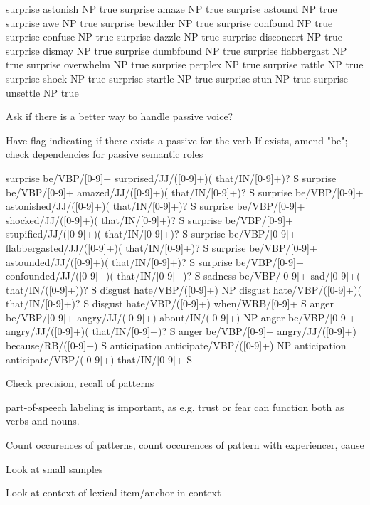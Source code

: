 surprise	astonish	NP	true
surprise	amaze	NP	true
surprise	astound	NP	true
surprise	awe	NP	true
surprise	bewilder	NP	true
surprise	confound	NP	true
surprise	confuse	NP	true
surprise	dazzle	NP	true
surprise	disconcert	NP	true
surprise	dismay	NP	true
surprise	dumbfound	NP	true
surprise	flabbergast	NP	true
surprise	overwhelm	NP	true
surprise	perplex	NP	true
surprise	rattle	NP	true
surprise	shock	NP	true
surprise	startle	NP	true
surprise	stun	NP	true
surprise	unsettle	NP	true


Ask if there is a better way to handle passive voice?

Have flag indicating if there exists a passive for the verb
If exists, amend "be"; check dependencies for passive semantic roles




surprise	be/VBP/[0-9]+ surprised/JJ/([0-9]+)( that/IN/[0-9]+)?	S
surprise	be/VBP/[0-9]+ amazed/JJ/([0-9]+)( that/IN/[0-9]+)?	S
surprise	be/VBP/[0-9]+ astonished/JJ/([0-9]+)( that/IN/[0-9]+)?	S
surprise	be/VBP/[0-9]+ shocked/JJ/([0-9]+)( that/IN/[0-9]+)?	S
surprise	be/VBP/[0-9]+ stupified/JJ/([0-9]+)( that/IN/[0-9]+)?	S
surprise	be/VBP/[0-9]+ flabbergasted/JJ/([0-9]+)( that/IN/[0-9]+)?	S
surprise	be/VBP/[0-9]+ astounded/JJ/([0-9]+)( that/IN/[0-9]+)?	S
surprise	be/VBP/[0-9]+ confounded/JJ/([0-9]+)( that/IN/[0-9]+)?	S
sadness	be/VBP/[0-9]+ sad/[0-9]+( that/IN/([0-9]+))?	S
disgust	hate/VBP/([0-9]+)	NP
disgust	hate/VBP/([0-9]+)( that/IN/[0-9]+)?	S
disgust	hate/VBP/([0-9]+) when/WRB/[0-9]+	S
anger	be/VBP/[0-9]+ angry/JJ/([0-9]+) about/IN/([0-9]+)	NP
anger	be/VBP/[0-9]+ angry/JJ/([0-9]+)( that/IN/[0-9]+)?	S
anger	be/VBP/[0-9]+ angry/JJ/([0-9]+) because/RB/([0-9]+)	S
anticipation	anticipate/VBP/([0-9]+)	NP
anticipation	anticipate/VBP/([0-9]+) that/IN/[0-9]+	S

Check precision, recall of patterns

part-of-speech labeling is important, as e.g. trust or fear can function both as verbs and nouns.

Count occurences of patterns, count occurences of pattern with experiencer, cause


Look at small samples

Look at context of lexical item/anchor in context



